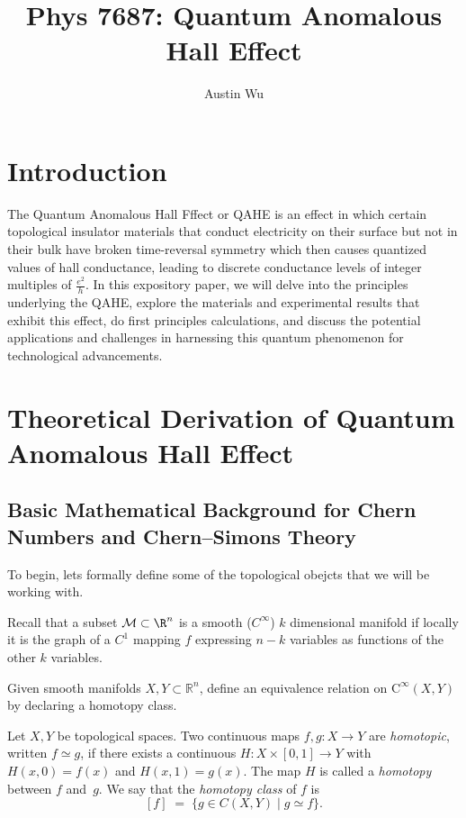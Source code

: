 \documentclass[aps,prb,twocolumn]{revtex4-2}
\begin{document}
  \title{Phys 7687: Quantum Anomalous Hall Effect}
  \author{Austin Wu}
  \maketitle
  \tableofcontents

  \section{Introduction}
  The Quantum Anomalous Hall Fffect or QAHE is an effect in which certain topological insulator materials that conduct electricity on their surface but not in their bulk have broken time-reversal symmetry which then causes quantized values of hall conductance, leading to discrete conductance levels of integer multiples of $\frac{e^2}h$. In this expository paper, we will delve into the principles underlying the QAHE, explore the materials and experimental results that exhibit this effect, do first principles calculations, and discuss the potential applications and challenges in harnessing this quantum phenomenon for technological advancements.



  \section{Theoretical Derivation of Quantum Anomalous Hall Effect}
    \subsection{Basic Mathematical Background for Chern Numbers and Chern--Simons Theory}
      To begin, lets formally define some of the topological obejcts that we will be working with.
      \begin{definition} 
        Recall that a subset $\mathcal{M}\subset \R^n$ is a smooth ($C^\infty$) $k$ dimensional manifold if locally it is the graph of a $C^1$ mapping $f$ expressing $n-k$ variables as functions of the other $k$ variables. \cite{hubbard_vector_2009}
      \end{definition}
      Given smooth manifolds $X,Y\subset\mathbb{R}^n$, define an equivalence
      relation on $\mathrm{C}^\infty(X,Y)$ by declaring a homotopy class.
      \begin{definition}
        Let $X,Y$ be topological spaces.  Two continuous maps $f,g\colon X\!\to\! Y$ are \emph{homotopic}, written $f\simeq g$, if there exists a continuous $H\colon X\times[0,1]\!\to\!Y$ with $H(x,0)=f(x)$ and $H(x,1)=g(x)$. The map $H$ is called a \emph{homotopy} between $f$ and~$g$. We say that the \emph{homotopy class} of $f$ is 
        \[ [f]\;=\;\{g\in C(X,Y)\mid g\simeq f\}. \]
      \end{definition}
\end{document}
